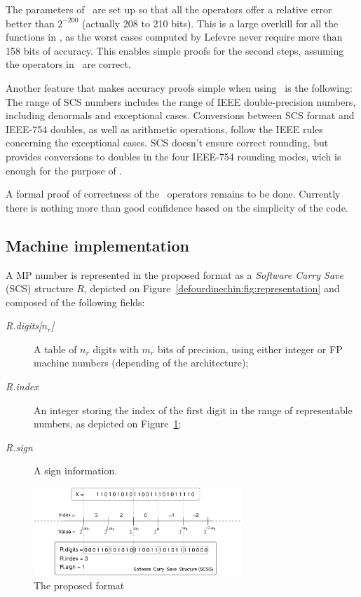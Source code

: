 The parameters of \scslib\ are set up so that all the operators offer
a relative error better than $2^{-200}$ (actually 208 to 210 bits).
This is a large overkill for all the functions in \crlibm, as the
worst cases computed by Lefevre never require more than 158 bits of
accuracy. This enables simple proofs for the second steps, assuming
the operators in \scslib\ are correct.

Another feature that makes accuracy proofs simple when using \scslib\ 
is the following: The range of SCS numbers includes the range of IEEE
double-precision numbers, including denormals and exceptional cases.
Conversions between SCS format and IEEE-754 doubles, as well as
arithmetic operations, follow the IEEE rules concerning the
exceptional cases. SCS doesn't ensure correct rounding, but provides
conversions to doubles in the four IEEE-754 rounding modes, wich is
enough for the purpose of \crlibm.

A formal proof of correctness of the \scslib\ operators remains to be
done. Currently there is nothing more than good confidence based on
the simplicity of the code.


\subsection{Machine implementation}
 A MP number is represented in the proposed format as a
\emph{Software Carry Save} (SCS) structure $R$, depicted on
Figure~\ref{defourdinechin:fig:representation} and composed of the following
fields:
\begin{description}
\item[\emph{R.digits[$n_r$]}] A table of $n_r$ digits with $m_r$ bits
  of precision, using either integer or FP machine numbers 
  (depending of the architecture);
\item[\emph{R.index}] An integer storing the index of the first digit
  in the range of representable numbers, as depicted on
  Figure~\ref{fig:representation};
 \item[\emph{R.sign}] A sign information.  
\end{description}

\begin{figure}[h]
\begin{center}
\includegraphics[width=0.7\textwidth]{fig_scs/exponent_representation} %
\caption{The proposed format \label{fig:representation}}
\end{center}
\end{figure}
  
